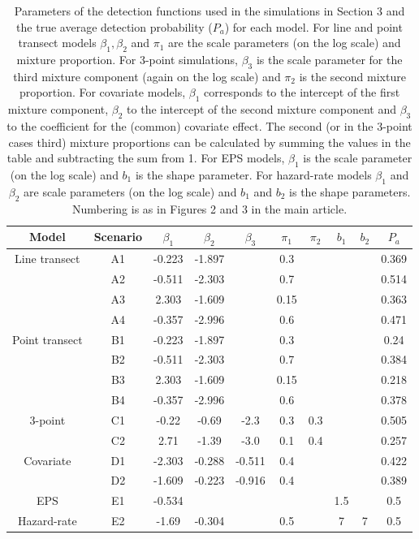 \documentclass[10pt]{article}
\begin{document}
\begin{table}[htbp]
\centering
\caption{Parameters of the detection functions used in the simulations in Section 3 and the true average detection probability ($P_a$) for each model. For line and point transect models $\beta_1, \beta_2$ and $\pi_1$ are the scale parameters (on the log scale) and mixture proportion. For 3-point simulations, $\beta_3$ is the scale parameter for the third mixture component (again on the log scale) and $\pi_2$ is the second mixture proportion. For covariate models, $\beta_1$ corresponds to the intercept of the first mixture component, $\beta_2$ to the intercept of the second mixture component and $\beta_3$ to the coefficient for the (common) covariate effect. The second (or in the 3-point cases third) mixture proportions can be calculated by summing the values in the table and subtracting the sum from 1. For EPS models, $\beta_1$ is the scale parameter (on the log scale) and $b_1$ is the shape parameter. For hazard-rate models $\beta_1$ and $\beta_2$ are scale parameters (on the log scale) and $b_1$ and $b_2$ is the shape parameters. Numbering is as in Figures 2 and 3 in the main article.}
\begin{tabular}{c c c c c c c c c c}\\
Model & Scenario & $\beta_1$ & $\beta_2$ & $\beta_3$ & $\pi_1$ & $\pi_2$ & $b_1$ & $b_2$ & $P_a$ \\
\hline
Line transect & A1 & -0.223 & -1.897 & &  0.3 & & & & 0.369\\
 & A2 & -0.511 & -2.303 & &  0.7 & & & & 0.514\\
 & A3 &  2.303 & -1.609 & & 0.15 & & & & 0.363\\
 & A4 & -0.357 & -2.996 & &  0.6 & & & & 0.471\\
Point transect &B1 & -0.223 & -1.897 & &  0.3 & & & & 0.24\\
 & B2 & -0.511 & -2.303 & &  0.7 & & & & 0.384\\
 & B3 &  2.303 & -1.609 & & 0.15 & & & & 0.218\\
 & B4 & -0.357 & -2.996 & &  0.6 & & & & 0.378\\
3-point & C1 &  -0.22 &  -0.69 &  -2.3 & 0.3 & 0.3 & & & 0.505\\
 & C2 &   2.71 &  -1.39 &  -3.0 & 0.1 & 0.4 & & & 0.257\\
Covariate & D1 & -2.303 & -0.288 & -0.511 & 0.4 & & & & 0.422\\
 & D2 & -1.609 & -0.223 & -0.916 & 0.4 & & & & 0.389\\
 EPS & E1 & -0.534 & & & & & 1.5& & 0.5 \\
 Hazard-rate & E2 & -1.69 & -0.304 & & 0.5 & & 7 & 7 & 0.5\\
\hline
\end{tabular}
\label{partable}
\bigskip
\end{table}



\end{document}
